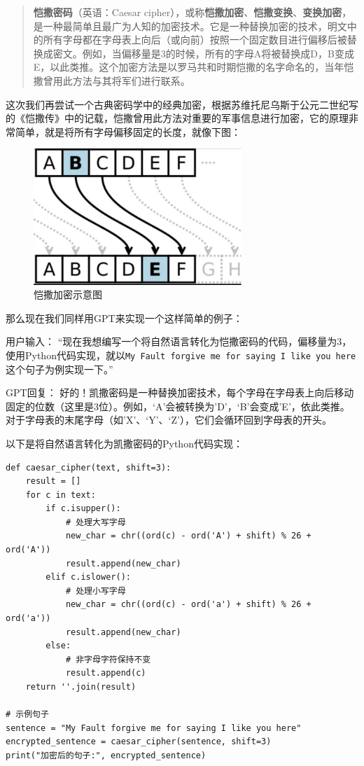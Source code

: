 \begin{quote}
\textbf{恺撒密码}（英语：Caesar
cipher），或称\textbf{恺撒加密}、\textbf{恺撒变换}、\textbf{变换加密}，是一种最简单且最广为人知的加密技术。它是一种替换加密的技术，明文中的所有字母都在字母表上向后（或向前）按照一个固定数目进行偏移后被替换成密文。例如，当偏移量是3的时候，所有的字母A将被替换成D，B变成E，以此类推。这个加密方法是以罗马共和时期恺撒的名字命名的，当年恺撒曾用此方法与其将军们进行联系。
\end{quote}

这次我们再尝试一个古典密码学中的经典加密，根据苏维托尼乌斯于公元二世纪写的《恺撒传》中的记载，恺撒曾用此方法对重要的军事信息进行加密，它的原理非常简单，就是将所有字母偏移固定的长度，就像下图：

\centering
\begin{figure}[H] %
    \centering %
    \includegraphics[width=0.7\textwidth]{sections/images/image-20250210174403824.png} %
    \caption{恺撒加密示意图} %
    \label{Fig.main1} %
\end{figure}%

那么现在我们同样用GPT来实现一个这样简单的例子：

用户输入：
``现在我想编写一个将自然语言转化为恺撒密码的代码，偏移量为3，使用Python代码实现，就以\texttt{My\ Fault\ forgive\ me\ for\ saying\ I\ like\ you\ here}这个句子为例实现一下。''

GPT回复：
好的！凯撒密码是一种替换加密技术，每个字母在字母表上向后移动固定的位数（这里是3位）。例如，`A'会被转换为'D'，`B'会变成'E'，依此类推。对于字母表的末尾字母（如'X'、`Y'、`Z'），它们会循环回到字母表的开头。

以下是将自然语言转化为凯撒密码的Python代码实现：

\begin{lstlisting}
def caesar_cipher(text, shift=3):
    result = []
    for c in text:
        if c.isupper():
            # 处理大写字母
            new_char = chr((ord(c) - ord('A') + shift) % 26 + ord('A'))
            result.append(new_char)
        elif c.islower():
            # 处理小写字母
            new_char = chr((ord(c) - ord('a') + shift) % 26 + ord('a'))
            result.append(new_char)
        else:
            # 非字母字符保持不变
            result.append(c)
    return ''.join(result)

# 示例句子
sentence = "My Fault forgive me for saying I like you here"
encrypted_sentence = caesar_cipher(sentence, shift=3)
print("加密后的句子:", encrypted_sentence)
\end{lstlisting}

